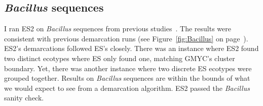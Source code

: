 %
%

\subsection*{\emph{Bacillus} sequences}
I ran ES2 on \emph{Bacillus} sequences from previous studies~\cite{connor2010ecology}.
The results were consistent with previous demarcation runs (see Figure~\ref{fig:Bacillus} on page~\pageref{fig:Bacillus}).
ES2's demarcations followed ES's closely.
There was an instance where ES2 found two distinct ecotypes where ES only found one, matching GMYC's cluster boundary.
Yet, there was another instance where two discrete ES ecotypes were grouped together.
Results on \emph{Bacillus} sequences are within the bounds of what we would expect to see from a demarcation algorithm.
ES2 passed the \emph{Bacillus} sanity check.

